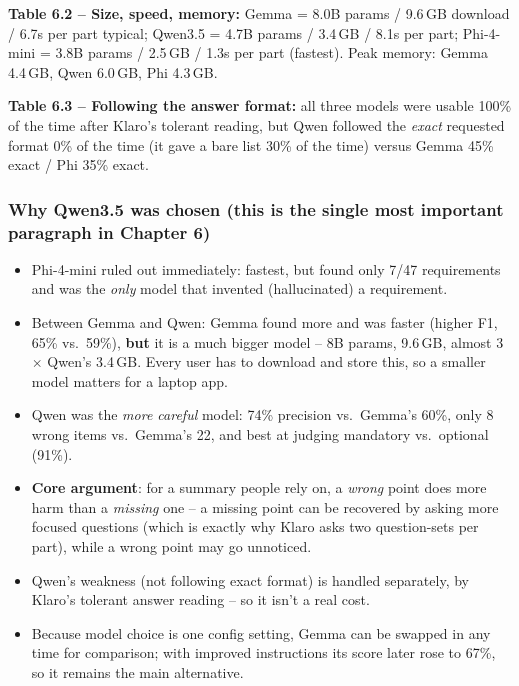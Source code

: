 \documentclass[11pt,a4paper]{article}
\begin{document}
\textbf{Table 6.2 -- Size, speed, memory:} Gemma = 8.0B params / 9.6\,GB download / 6.7s per part
typical; Qwen3.5 = 4.7B params / 3.4\,GB / 8.1s per part; Phi-4-mini = 3.8B params / 2.5\,GB / 1.3s
per part (fastest). Peak memory: Gemma 4.4\,GB, Qwen 6.0\,GB, Phi 4.3\,GB.

\textbf{Table 6.3 -- Following the answer format:} all three models were usable 100\% of the time
after Klaro's tolerant reading, but Qwen followed the \emph{exact} requested format 0\% of the time
(it gave a bare list 30\% of the time) versus Gemma 45\% exact / Phi 35\% exact.

\subsubsection*{Why Qwen3.5 was chosen (this is the single most important paragraph in Chapter 6)}
\begin{itemize}[leftmargin=1.2cm]
  \item Phi-4-mini ruled out immediately: fastest, but found only 7/47 requirements and was the
    \emph{only} model that invented (hallucinated) a requirement.
  \item Between Gemma and Qwen: Gemma found more and was faster (higher F1, 65\% vs.\ 59\%), \textbf{but}
    it is a much bigger model -- 8B params, 9.6\,GB, almost 3$\times$ Qwen's 3.4\,GB. Every user has
    to download and store this, so a smaller model matters for a laptop app.
  \item Qwen was the \emph{more careful} model: 74\% precision vs.\ Gemma's 60\%, only 8 wrong items
    vs.\ Gemma's 22, and best at judging mandatory vs.\ optional (91\%).
  \item \textbf{Core argument}: for a summary people rely on, a \emph{wrong} point does more harm
    than a \emph{missing} one -- a missing point can be recovered by asking more focused questions
    (which is exactly why Klaro asks two question-sets per part), while a wrong point may go
    unnoticed.
  \item Qwen's weakness (not following exact format) is handled separately, by Klaro's tolerant answer
    reading -- so it isn't a real cost.
  \item Because model choice is one config setting, Gemma can be swapped in any time for comparison;
    with improved instructions its score later rose to 67\%, so it remains the main alternative.
\end{itemize}
\end{document}
